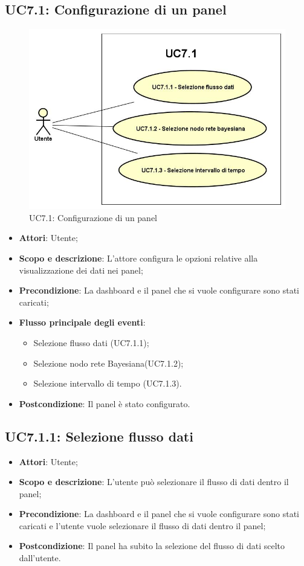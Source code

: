 \subsection{UC7.1: Configurazione di un panel}
\hypertarget{UC7.1}{}
\begin{figure} [H]
	\centering
	\includegraphics[scale=0.45]{Img/UC7-1}
	\caption{UC7.1: Configurazione di un panel}\label{}
\end{figure}
\begin{itemize}
	\item \textbf{Attori}: Utente;
	\item \textbf{Scopo e descrizione}: L'attore configura le opzioni relative alla visualizzazione dei dati nei panel;
	\item \textbf{Precondizione}: La dashboard e il panel che si vuole configurare sono stati caricati;
	\item \textbf{Flusso principale degli eventi}:
	\begin{itemize}
		\item Selezione flusso dati  (UC7.1.1);
		\item Selezione nodo rete Bayesiana(UC7.1.2);
		\item Selezione intervallo di tempo (UC7.1.3).		
	\end{itemize}
	\item \textbf{Postcondizione}: Il panel è stato configurato.
\end{itemize}
\subsection{UC7.1.1: Selezione flusso dati}
\hypertarget{UC7.1.1}{}
\begin{itemize}
	\item \textbf{Attori}: Utente;
	\item \textbf{Scopo e descrizione}: L'utente può selezionare il flusso di dati dentro il panel;
	\item \textbf{Precondizione}: La dashboard e il panel che si vuole configurare sono stati caricati e l'utente vuole selezionare il flusso di dati dentro il panel;
	\item \textbf{Postcondizione}: Il panel ha subito la selezione del flusso di dati scelto dall'utente.
\end{itemize}
